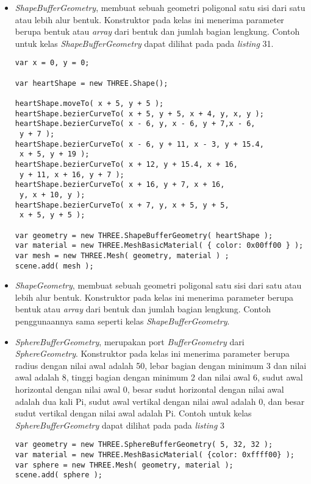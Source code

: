 \documentclass[a4paper,twoside]{article}
\begin{document}
\begin{enumerate}
\begin{itemize}
\begin{itemize}
	\item {\it ShapeBufferGeometry}, membuat sebuah geometri poligonal satu sisi dari satu atau lebih alur bentuk. Konstruktor pada kelas ini menerima parameter berupa bentuk atau {\it array} dari bentuk dan jumlah bagian lengkung. Contoh untuk kelas {\it ShapeBufferGeometry} dapat dilihat pada pada {\it listing} 31.
	
\begin{lstlisting}[caption={Contoh penggunaan kelas {\it ShapeBufferGeometry}.},captionpos=b]
var x = 0, y = 0;

var heartShape = new THREE.Shape();

heartShape.moveTo( x + 5, y + 5 );
heartShape.bezierCurveTo( x + 5, y + 5, x + 4, y, x, y );
heartShape.bezierCurveTo( x - 6, y, x - 6, y + 7,x - 6,
 y + 7 );
heartShape.bezierCurveTo( x - 6, y + 11, x - 3, y + 15.4,
 x + 5, y + 19 );
heartShape.bezierCurveTo( x + 12, y + 15.4, x + 16,
 y + 11, x + 16, y + 7 );
heartShape.bezierCurveTo( x + 16, y + 7, x + 16,
 y, x + 10, y );
heartShape.bezierCurveTo( x + 7, y, x + 5, y + 5,
 x + 5, y + 5 );

var geometry = new THREE.ShapeBufferGeometry( heartShape );
var material = new THREE.MeshBasicMaterial( { color: 0x00ff00 } );
var mesh = new THREE.Mesh( geometry, material ) ;
scene.add( mesh );
\end{lstlisting}

	\item {\it ShapeGeometry}, membuat sebuah geometri poligonal satu sisi dari satu atau lebih alur bentuk. Konstruktor pada kelas ini menerima parameter berupa bentuk atau {\it array} dari bentuk dan jumlah bagian lengkung. Contoh penggunaannya sama seperti kelas {\it ShapeBufferGeometry}.

	\item {\it SphereBufferGeometry}, merupakan port {\it BufferGeometry} dari {\it SphereGeometry}. Konstruktor pada kelas ini menerima parameter berupa radius dengan nilai awal adalah 50, lebar bagian dengan minimum 3 dan nilai awal adalah 8, tinggi bagian dengan minimum 2 dan nilai awal 6, sudut awal horizontal dengan nilai awal 0, besar sudut horizontal dengan nilai awal adalah dua kali Pi, sudut awal vertikal dengan nilai awal adalah 0, dan besar sudut vertikal dengan nilai awal adalah Pi. Contoh untuk kelas {\it SphereBufferGeometry} dapat dilihat pada pada {\it listing} 3
	
\begin{lstlisting}[caption={Contoh penggunaan kelas {\it SphereBufferGeometry}.},captionpos=b]
var geometry = new THREE.SphereBufferGeometry( 5, 32, 32 );
var material = new THREE.MeshBasicMaterial( {color: 0xffff00} );
var sphere = new THREE.Mesh( geometry, material );
scene.add( sphere );
\end{lstlisting}


\end{itemize}
\end{itemize}
\end{enumerate}
\end{document}
